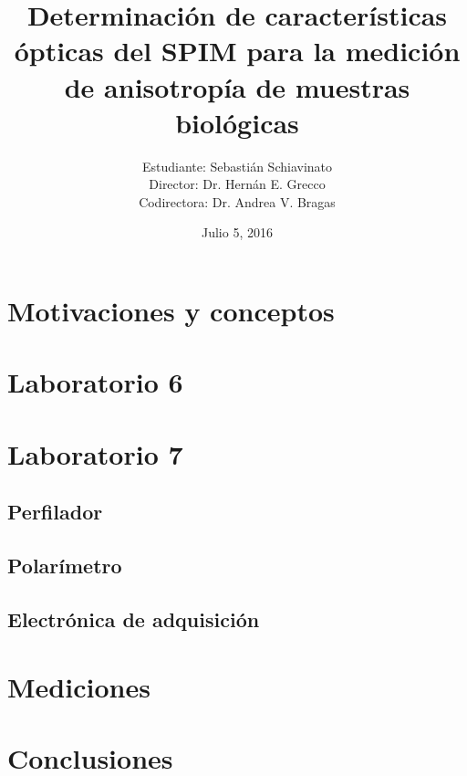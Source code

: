 \documentclass{beamer}
\author{Estudiante: {\footnotesize Sebastián Schiavinato} \\ Director: {\footnotesize Dr. Hernán E. Grecco} \\ Codirectora: {\footnotesize Dr. Andrea V. Bragas}}
\title{Determinación de características ópticas del SPIM para la medición de anisotropía de muestras biológicas}
\institute{Laboratorio 6 y 7, DF, FCEyN, UBA}
\date{Julio 5, 2016}
\begin{document}
    \begin{frame}[plain]
        \titlepage
    \end{frame}
    \section{Motivaciones y conceptos}
        
        
    \section{Laboratorio 6}
        
    \section{Laboratorio 7}
        \subsection{Perfilador}
            
        \subsection{Polarímetro}
            
        \subsection{Electrónica de adquisición}
            
    \section{Mediciones}
        
    \section{Conclusiones}
        
        
\end{document}
